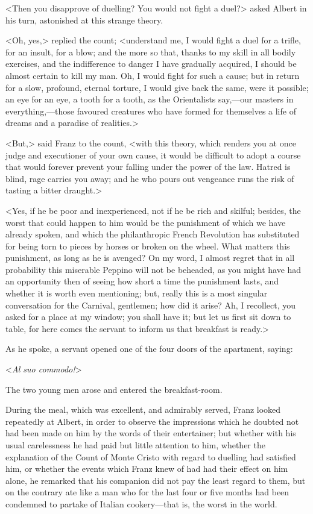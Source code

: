  <Then you disapprove of duelling? You would not fight a duel?> asked Albert in his turn, astonished at this strange theory. 

 <Oh, yes,> replied the count; <understand me, I would fight a duel for a trifle, for an insult, for a blow; and the more so that, thanks to my skill in all bodily exercises, and the indifference to danger I have gradually acquired, I should be almost certain to kill my man. Oh, I would fight for such a cause; but in return for a slow, profound, eternal torture, I would give back the same, were it possible; an eye for an eye, a tooth for a tooth, as the Orientalists say,—our masters in everything,—those favoured creatures who have formed for themselves a life of dreams and a paradise of realities.> 

 <But,> said Franz to the count, <with this theory, which renders you at once judge and executioner of your own cause, it would be difficult to adopt a course that would forever prevent your falling under the power of the law. Hatred is blind, rage carries you away; and he who pours out vengeance runs the risk of tasting a bitter draught.> 

 <Yes, if he be poor and inexperienced, not if he be rich and skilful; besides, the worst that could happen to him would be the punishment of which we have already spoken, and which the philanthropic French Revolution has substituted for being torn to pieces by horses or broken on the wheel. What matters this punishment, as long as he is avenged? On my word, I almost regret that in all probability this miserable Peppino will not be beheaded, as you might have had an opportunity then of seeing how short a time the punishment lasts, and whether it is worth even mentioning; but, really this is a most singular conversation for the Carnival, gentlemen; how did it arise? Ah, I recollect, you asked for a place at my window; you shall have it; but let us first sit down to table, for here comes the servant to inform us that breakfast is ready.> 

 As he spoke, a servant opened one of the four doors of the apartment, saying: 

 <\textit{Al suo commodo!}> 

 The two young men arose and entered the breakfast-room. 

 During the meal, which was excellent, and admirably served, Franz looked repeatedly at Albert, in order to observe the impressions which he doubted not had been made on him by the words of their entertainer; but whether with his usual carelessness he had paid but little attention to him, whether the explanation of the Count of Monte Cristo with regard to duelling had satisfied him, or whether the events which Franz knew of had had their effect on him alone, he remarked that his companion did not pay the least regard to them, but on the contrary ate like a man who for the last four or five months had been condemned to partake of Italian cookery—that is, the worst in the world. 

